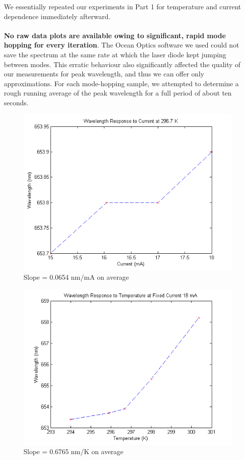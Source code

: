 \documentclass[10pt,a4paper]{article}
\begin{document}
We essentially repeated our experiments in Part 1 for temperature and current dependence immediately afterward.\\
\\
\textbf{No raw data plots are available owing to significant, rapid mode hopping for every iteration}. The Ocean Optics software we used could not save the spectrum at the same rate at which the laser diode kept jumping between modes. This erratic behaviour also significantly affected the quality of our measurements for peak wavelength, and thus we can offer only approximations. For each mode-hopping sample, we attempted to determine a rough running average of the peak wavelength for a full period of about ten seconds. 
\begin{figure}[H]
\centering
\includegraphics[scale=0.7]{../Analysis/diff_wave_currents.png}
\caption{Slope = 0.0654 nm/mA on average} 
\end{figure}
\begin{figure}[H]
\centering
\includegraphics[scale=0.7]{../Analysis/diff_wave_temperatures.png}
\caption{Slope = 0.6765 nm/K on average} 
\end{figure}
\end{document}
